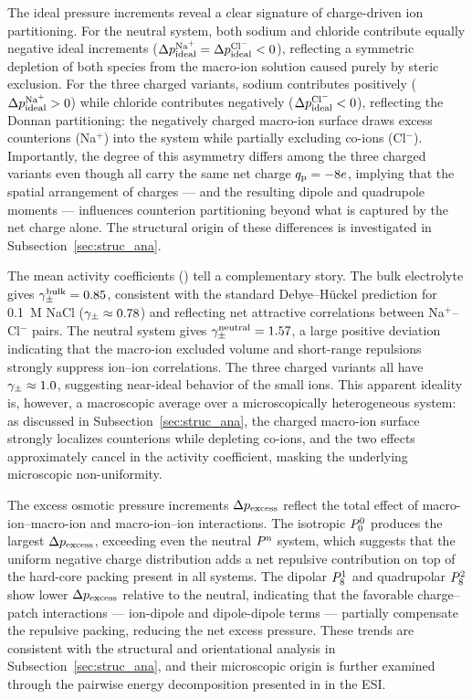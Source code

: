 \documentclass{article}
\begin{document}
The ideal pressure increments reveal a clear signature of charge-driven ion partitioning.
For the neutral system, both sodium and chloride contribute equally negative ideal increments ($\dpid^{\ce{Na+}} = \dpid^{\ce{Cl-}} < 0$), reflecting a symmetric depletion of both species from the macro-ion solution caused purely by steric exclusion.
For the three charged variants, sodium contributes positively ($\dpid^{\ce{Na+}} > 0$) while chloride contributes negatively ($\dpid^{\ce{Cl-}} < 0$), reflecting the Donnan partitioning: the negatively charged macro-ion surface draws excess counterions (Na$^+$) into the system while partially excluding co-ions (Cl$^-$).
Importantly, the degree of this asymmetry differs among the three charged variants even though all carry the same net charge $q_{\mathrm{p}} = -8e$, implying that the spatial arrangement of charges — and the resulting dipole and quadrupole moments — influences counterion partitioning beyond what is captured by the net charge alone.
The structural origin of these differences is investigated in Subsection~\ref{sec:struc_ana}.

The mean activity coefficients () tell a complementary story.
The bulk electrolyte gives $\gamma_{\pm}^{\mathrm{bulk}} = 0.85$, consistent with the standard Debye--Hückel prediction for 0.1~M NaCl ($\gamma_{\pm} \approx 0.78$) and reflecting net attractive correlations between Na$^+$--Cl$^-$ pairs.
The neutral system gives $\gamma_{\pm}^{\mathrm{neutral}} = 1.57$, a large positive deviation indicating that the macro-ion excluded volume and short-range repulsions strongly suppress ion--ion correlations.
The three charged variants all have $\gamma_{\pm} \approx 1.0$, suggesting near-ideal behavior of the small ions.
This apparent ideality is, however, a macroscopic average over a microscopically heterogeneous system: as discussed in Subsection~\ref{sec:struc_ana}, the charged macro-ion surface strongly localizes counterions while depleting co-ions, and the two effects approximately cancel in the activity coefficient, masking the underlying microscopic non-uniformity.

The excess osmotic pressure increments $\Delta p_\mathrm{excess}$ reflect the total effect of macro-ion--macro-ion and macro-ion--ion interactions.
The isotropic $P^{0}_{0}$ produces the largest $\Delta p_\mathrm{excess}$, exceeding even the neutral $P^\mathrm{n}$ system, which suggests that the uniform negative charge distribution adds a net repulsive contribution on top of the hard-core packing present in all systems.
The dipolar $P^{1}_{8}$ and quadrupolar $P^{2}_{8}$ show lower $\Delta p_\mathrm{excess}$ relative to the neutral, indicating that the favorable charge--patch interactions — ion-dipole and dipole-dipole terms — partially compensate the repulsive packing, reducing the net excess pressure.
These trends are consistent with the structural and orientational analysis in Subsection~\ref{sec:struc_ana}, and their microscopic origin is further examined through the pairwise energy decomposition presented in  in the ESI.
\end{document}
